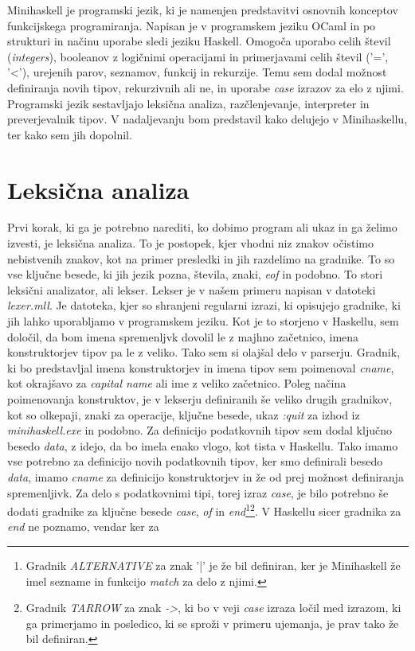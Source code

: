 \documentclass[12pt,a4paper,openany]{book}
\begin{document}
Minihaskell je programski jezik, ki je namenjen predstavitvi osnovnih konceptov funkcijskega programiranja. Napisan je v programskem jeziku 
OCaml in po strukturi in načinu uporabe sledi jeziku Haskell. Omogoča uporabo celih števil (\textit{integers}), booleanov z logičnimi operacijami in primerjavami 
celih števil ('=', '<'), urejenih parov, seznamov, funkcij in rekurzije. Temu sem dodal možnost definiranja novih tipov, rekurzivnih ali ne, in 
uporabe \emph{case} izrazov za elo z njimi. Programski jezik sestavljajo leksična analiza, razčlenjevanje, interpreter in preverjevalnik tipov. V nadaljevanju bom predstavil kako 
delujejo v Minihaskellu, ter kako sem jih dopolnil.

\section{Leksična analiza}
Prvi korak, ki ga je potrebno narediti, ko dobimo program ali ukaz in ga želimo izvesti, je leksična analiza. To je postopek, kjer vhodni niz znakov očistimo nebistvenih znakov, kot 
na primer presledki in jih razdelimo na gradnike. To so vse ključne besede, ki jih jezik pozna, števila, znaki, \emph{eof} in podobno. To stori leksični analizator, ali lekser. 
Lekser je v našem primeru napisan v datoteki \emph{lexer.mll}. Je datoteka, kjer so shranjeni regularni izrazi, ki opisujejo gradnike, ki jih lahko uporabljamo v programskem jeziku. 
Kot je to storjeno v Haskellu, sem določil, da bom imena spremenljvk dovolil le z majhno začetnico, imena konstruktorjev tipov pa le z veliko. Tako sem si olajšal delo v parserju. 
Gradnik, ki bo predstavljal imena konstruktorjev in imena tipov sem poimenoval \emph{cname}, kot okrajšavo za \textit{capital name} ali ime z veliko začetnico. Poleg načina poimenovanja 
konstruktov, je v lekserju definiranih še veliko drugih gradnikov, kot so olkepaji, znaki za operacije, ključne besede, ukaz \emph{:quit} za izhod iz \emph{minihaskell.exe} 
in podobno. Za definicijo podatkovnih tipov sem dodal ključno besedo \emph{data}, z idejo, da bo imela enako vlogo, kot tista v Haskellu. Tako imamo vse potrebno za 
definicijo novih podatkovnih tipov, ker smo definirali besedo \emph{data}, imamo \emph{cname} za definicijo konstruktorjev in že od prej možnost definiranja spremenljivk.
Za delo s podatkovnimi tipi, torej izraz \emph{case}, je bilo potrebno še dodati gradnike za ključne besede \emph{case}, \emph{of} in \emph{end}\footnote{Gradnik \emph{ALTERNATIVE} 
za znak '|' je že bil definiran, ker je Minihaskell že imel sezname in funkcijo \emph{match} za delo z njimi.}\footnote{Gradnik \emph{TARROW} za znak \emph{->}, ki bo v veji \emph{case} 
izraza ločil med izrazom, ki ga primerjamo in posledico, ki se sproži v primeru ujemanja, je prav tako že bil definiran.}. V Haskellu sicer gradnika za \emph{end} ne poznamo, vendar ker za 
\end{document}
